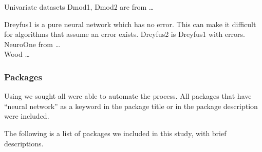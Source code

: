 Univariate datasets Dmod1, Dmod2 are from \ldots{}

Dreyfus1 is a pure neural network which has no error. This can make it
difficult for algorithms that assume an error exists. Dreyfus2 is
Dreyfus1 with errors. NeuroOne from \ldots{}\\
Wood \ldots{}

\hypertarget{packages}{%
\subsubsection{Packages}\label{packages}}

Using  \citep{R-RWsearch} we sought all were able to
automate the process. All packages that have ``neural network'' as a
keyword in the package title or in the package description were
included.

The following is a list of packages we included in this study, with
brief descriptions.

